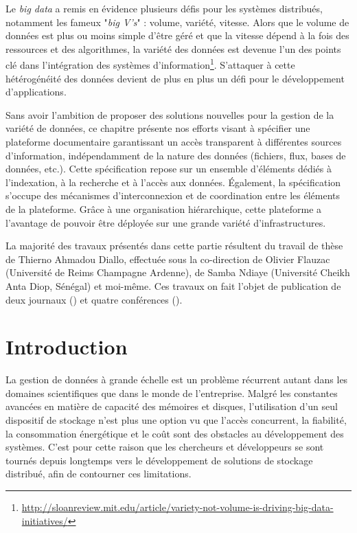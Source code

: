 \begin{resume}

Le \textit{big data} a remis en évidence plusieurs défis pour les systèmes distribués, notamment les fameux "\textit{big V's}" : volume, variété, vitesse. Alors que le volume de données est plus ou moins simple d'être géré et que la vitesse dépend à la fois des ressources et des algorithmes, la variété des données est devenue l'un des points clé dans l'intégration des systèmes d'information\footnote{{\scriptsize \url{http://sloanreview.mit.edu/article/variety-not-volume-is-driving-big-data-initiatives/}}}. S'attaquer à cette hétérogénéité des données devient de plus en plus un défi pour le développement d'applications. 

Sans avoir l'ambition de proposer des solutions nouvelles pour la gestion de la variété de données, ce chapitre présente nos efforts visant à spécifier une plateforme documentaire garantissant un accès transparent à différentes sources d'information, indépendamment de la nature des données (fichiers, flux, bases de données, etc.). Cette spécification repose sur un ensemble d'éléments dédiés à l'indexation, à la recherche et à l'accès aux données. Également, la spécification s'occupe des mécanismes d'interconnexion et de coordination entre les éléments de la plateforme. Grâce à une organisation hiérarchique, cette plateforme a l'avantage de pouvoir être déployée sur une grande variété d'infrastructures.  

La majorité des travaux présentés dans cette partie résultent du travail de thèse de Thierno Ahmadou Diallo, effectuée sous la co-direction de Olivier Flauzac (Université de Reims Champagne Ardenne), de Samba Ndiaye (Université Cheikh Anta Diop, Sénégal) et moi-même. Ces travaux on fait l'objet de publication de deux journaux (\cite{Steffenel2015-Grappes,Steffenel12f}) et quatre conférences (\cite{Steffenel2014-CARI,Steffenel13a,Steffenel13c,Steffenel12d}).



\end{resume}

\section{Introduction}

La gestion de données à grande échelle est un problème récurrent autant dans les domaines scientifiques que dans le monde de l'entreprise. Malgré les constantes avancées en matière de capacité des mémoires et disques, l'utilisation d'un seul dispositif de stockage n'est plus une option vu que l'accès concurrent, la fiabilité, la consommation énergétique et le coût sont des obstacles au développement des systèmes. C'est pour cette raison que les chercheurs et développeurs se sont tournés depuis longtemps vers le développement de solutions de stockage distribué, afin de contourner ces limitations.

